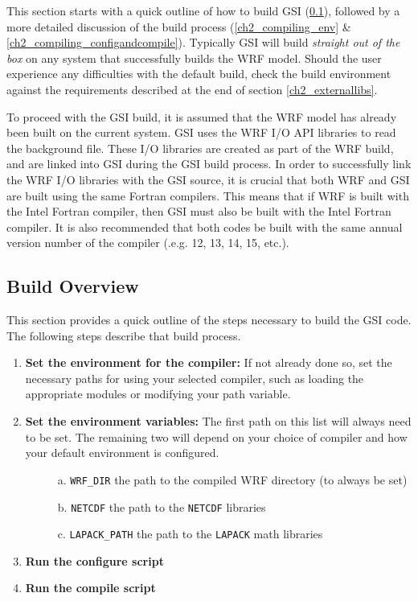 This section starts with a quick outline of how to build GSI (\ref{ch2_compiling_overview}), followed by a more detailed discussion of the build process (\ref{ch2_compiling_env} \& \ref{ch2_compiling_configandcompile}). Typically GSI will build \textit{straight out of the box} on any system that successfully builds the WRF model. Should the user experience any difficulties with the default build, check the build environment against the requirements described at the end of section \ref{ch2_externallibs}.

To proceed with the GSI build, it is assumed that the WRF model has already been built on the current system. GSI uses the WRF I/O API libraries to read the background file. These I/O libraries are created as part of the WRF build, and are linked into GSI during the GSI build process. In order to successfully link the WRF I/O libraries with the GSI source, it is crucial that both WRF and GSI are built using the same Fortran compilers. This means that if WRF is built with the Intel Fortran compiler, then GSI must also be built with the Intel Fortran compiler. It is also recommended that both codes be built with the same annual version number of the compiler
(.e.g. 12, 13, 14, 15, etc.). 

\subsection{Build Overview} \label{ch2_compiling_overview}

This section provides a quick outline of the steps necessary to build the GSI code. The following steps describe that build process.

\begin{enumerate}
\item \textbf{Set the environment for the compiler:} If not already done so, set the necessary paths for using your selected compiler, such as loading the appropriate modules or modifying your path variable.
\item \textbf{Set the environment variables:} The first path on this list will always need to be set. The remaining two will depend on your choice of compiler and how your default environment is configured.
\begin{description}
\item[]a. \verb|WRF_DIR| the path to the compiled WRF directory (to always be set) 
\item[]b. \verb|NETCDF| the path to the \verb|NETCDF| libraries
\item[]c. \verb|LAPACK_PATH| the path to the \verb|LAPACK| math libraries
\end{description}
\item \textbf{Run the configure script}
\item \textbf{Run the compile script}
\end{enumerate}

